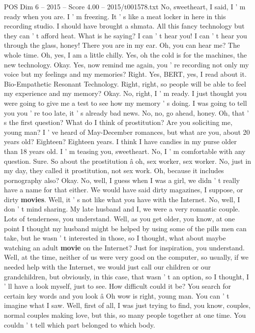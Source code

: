 \begin{textsample}{POS Dim 6 – 2015 – Score 4.00 – 2015/t001578.txt}
No, sweetheart, I said, I ' m ready when you are.
I ' m freezing.
It ' s like a meat locker in here in this recording studio.
I should have brought a shmata.
All this fancy technology but they can ' t afford heat.
What is he saying?
I can ' t hear you!
I can ' t hear you through the glass, honey!
There you are in my ear.
Oh, you can hear me?
The whole time.
Oh, yes, I am a little chilly.
Yes, oh the cold is for the machines, the new technology.
Okay.
Yes, now remind me again, you ' re recording not only my voice but my feelings and my memories?
Right.
Yes, BERT, yes, I read about it.
Bio-Empathetic Resonant Technology.
Right, right, so people will be able to feel my experience and my memory?
Okay.
No, right, I ' m ready.
I just thought you were going to give me a test to see how my memory ' s doing.
I was going to tell you you ' re too late, it ' s already bad news.
No, no, go ahead, honey.
Oh, that ' s the first question?
What do I think of prostitution?
Are you soliciting me, young man?
I ' ve heard of May-December romances, but what are you, about 20 years old?
Eighteen?
Eighteen years.
I think I have candies in my purse older than 18 years old.
I ' m teasing you, sweetheart.
No, I ' m comfortable with any question.
Sure.
So about the prostitution â oh, sex worker, sex worker.
No, just in my day, they called it prostitution, not sex work.
Oh, because it includes pornography also?
Okay.
No, well, I guess when I was a girl, we didn ' t really have a name for that either.
We would have said dirty magazines, I suppose, or dirty \textbf{movies}.
Well, it ' s not like what you have with the Internet.
No, well, I don ' t mind sharing.
My late husband and I, we were a very romantic couple.
Lots of tenderness, you understand.
Well, as you get older, you know, at one point I thought my husband might be helped by using some of the pills men can take, but he wasn ' t interested in those, so I thought, what about maybe watching an adult \textbf{movie} on the Internet?
Just for inspiration, you understand.
Well, at the time, neither of us were very good on the computer, so usually, if we needed help with the Internet, we would just call our children or our grandchildren, but obviously, in this case, that wasn ' t an option, so I thought, I ' ll have a look myself, just to see.
How difficult could it be?
You search for certain key words and you look â Oh wow is right, young man.
You can ' t imagine what I saw.
Well, first of all, I was just trying to find, you know, couples, normal couples making love, but this, so many people together at one time.
You couldn ' t tell which part belonged to which body.

\end{textsample}
